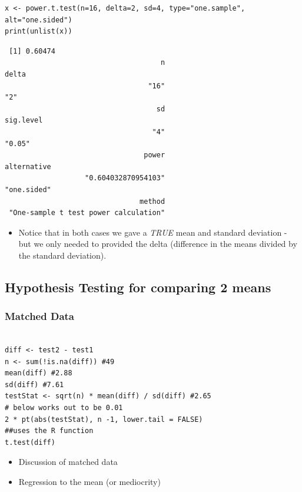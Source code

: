 \documentclass[11pt]{article}
\begin{document}
\begin{verbatim}
x <- power.t.test(n=16, delta=2, sd=4, type="one.sample", alt="one.sided")
print(unlist(x))
\end{verbatim}

\begin{verbatim}
 [1] 0.60474
                                     n                                 delta 
                                  "16"                                   "2" 
                                    sd                             sig.level 
                                   "4"                                "0.05" 
                                 power                           alternative 
                   "0.604032870954103"                           "one.sided" 
                                method 
 "One-sample t test power calculation"
\end{verbatim}

\begin{itemize}
\item Notice that in both cases we gave a \emph{TRUE} mean and standard
  deviation - but we only needed to provided the delta (difference in
  the means divided by the standard deviation).
\end{itemize}
 
\subsection{Hypothesis Testing for comparing 2 means}
\label{sec-1-3}
\subsubsection{Matched Data}
\label{sec-1-3-1}




\begin{verbatim}

diff <- test2 - test1
n <- sum(!is.na(diff)) #49
mean(diff) #2.88
sd(diff) #7.61
testStat <- sqrt(n) * mean(diff) / sd(diff) #2.65
# below works out to be 0.01
2 * pt(abs(testStat), n -1, lower.tail = FALSE)
##uses the R function
t.test(diff)
\end{verbatim}
\begin{itemize}

\item Discussion of matched data
\label{sec-1-3-1-1}%


\item Regression to the mean (or mediocrity)
\label{sec-1-3-1-2}%

\end{itemize} %
\end{document}
